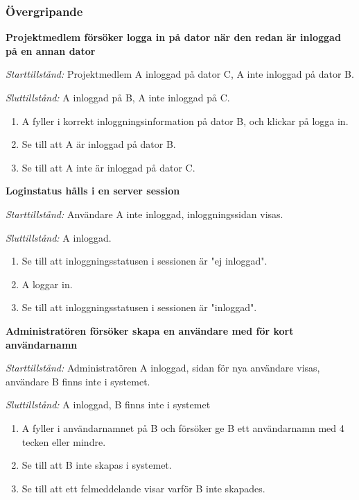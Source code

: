 \documentclass[a4paper]{article}
\begin{document}
\subsubsection{Övergripande}

\begin{FT}
\item
\textbf{Projektmedlem försöker logga in på dator när den redan är inloggad på en annan dator}

\emph{Starttillstånd:} Projektmedlem A inloggad på dator C, A inte inloggad på dator B.

\emph{Sluttillstånd:} A inloggad på B, A inte inloggad på C.

\begin{enumerate}
\item A fyller i korrekt inloggningsinformation på dator B, och klickar på logga in.
\item Se till att A är inloggad på dator B.
\item Se till att A inte är inloggad på dator C.
\end{enumerate}


\item
\textbf{Loginstatus hålls i en server session}

\emph{Starttillstånd:} Användare A inte inloggad, inloggningssidan visas.

\emph{Sluttillstånd:} A inloggad.

\begin{enumerate}
\item Se till att inloggningsstatusen i sessionen är "ej inloggad".
\item A loggar in.
\item Se till att inloggningsstatusen i sessionen är "inloggad".
\end{enumerate}





\item
\textbf{Administratören försöker skapa en användare med för kort användarnamn}

\emph{Starttillstånd:} Administratören A inloggad, sidan för nya användare visas, användare B finns inte i systemet.

\emph{Sluttillstånd:} A inloggad, B finns inte i systemet

\begin{enumerate}
\item A fyller i användarnamnet på B och försöker ge B ett användarnamn med 4 tecken eller mindre.
\item Se till att B inte skapas i systemet.
\item Se till att ett felmeddelande visar varför B inte skapades.
\end{enumerate}


\end{FT}
\end{document}
